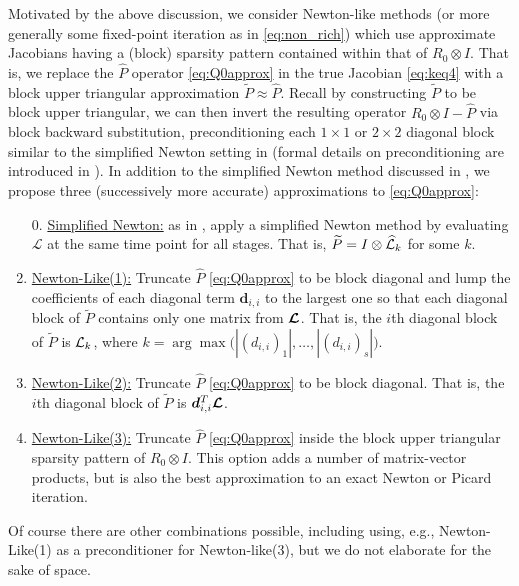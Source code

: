 \documentclass[review]{siamart}
\begin{document}
Motivated by the above discussion, we consider Newton-like methods (or more
generally some fixed-point iteration as in \eqref{eq:non_rich}) which use
approximate Jacobians having a (block) sparsity pattern contained within that of
$R_0 \otimes I$. That is, we replace the $\widehat{P}$ operator
\eqref{eq:Q0approx} in the true Jacobian \eqref{eq:keq4} with a block upper
triangular approximation $\widetilde{P} \approx \widehat{P}$. Recall by
constructing $\widetilde{P}$ to be block upper triangular, we can then invert
the resulting operator $R_0 \otimes I -\widehat{P}$ via block backward
substitution, preconditioning each $1\times 1$ or $2\times 2$ diagonal block
similar to the simplified Newton setting in  (formal
details on preconditioning are introduced in ). In addition to
the simplified Newton method discussed in , we propose
three (successively more accurate) approximations to \eqref{eq:Q0approx}:
\vspace{1ex}
%
\begin{enumerate}
\setlength\itemsep{0.5em}
\item[0.] \underline{Simplified Newton:} as in , apply a
simplified Newton method by evaluating $\mathcal{L}$ at the same time point for
all stages. That is, $\widetilde{P} = I \otimes \widehat{{\cal L}}_k$ for some $k$.

\item \underline{Newton-Like(1):} Truncate $\widehat{P}$ \eqref{eq:Q0approx} to
be block diagonal and lump the coefficients of each diagonal term $\bm{d}_{i,i}$
to the largest one so that each diagonal block of $\widetilde{P}$ contains only
one matrix from $\bm{{\cal L}}$. That is, the $i$th diagonal block of
$\widetilde{P}$ is ${\cal L}_{k}$, where $k = \arg \max \big(|(d_{i,i})_1|,
\ldots, |(d_{i,i})_s| \big)$.

\item \underline{Newton-Like(2):} Truncate $\widehat{P}$ \eqref{eq:Q0approx} to
be block diagonal. That is, the $i$th diagonal block of $\widetilde{P}$ is
$\bm{d}^T_{i,i} \bm{{\cal L}}$.

\item \underline{Newton-Like(3):} Truncate $\widehat{P}$ \eqref{eq:Q0approx}
inside the block upper triangular sparsity pattern of $R_0 \otimes I$. This
option adds a number of matrix-vector products, but is also the best approximation
to an exact Newton or Picard iteration.

\end{enumerate}
Of course there are other combinations possible, including using, e.g.,
Newton-Like(1) as a preconditioner for Newton-like(3), but we do not
elaborate for the sake of space.
\end{document}
